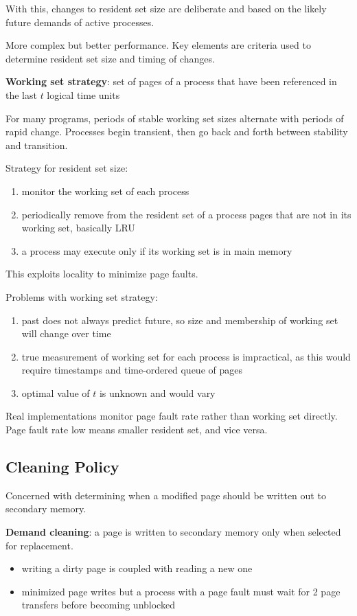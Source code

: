 \documentclass[11pt]{article}
\begin{document}
\begin{enumerate}
With this, changes to resident set size are deliberate and based on the likely
future demands of active processes.

More complex but better performance.
Key elements are criteria used to determine resident set size and timing of
changes.

\textbf{Working set strategy}: set of pages of a process that have been referenced
in the last \(t\) logical time units

For many programs, periods of stable working set sizes alternate with periods of
rapid change.
Processes begin transient, then go back and forth between stability and transition.

Strategy for resident set size:
\begin{enumerate}
\item monitor the working set of each process
\item periodically remove from the resident set of a process pages that are not in
its working set, basically LRU
\item a process may execute only if its working set is in main memory
\end{enumerate}

This exploits locality to minimize page faults.

Problems with working set strategy:
\begin{enumerate}
\item past does not always predict future, so size and membership of working set will
change over time
\item true measurement of working set for each process is impractical, as this would
require timestamps and time-ordered queue of pages
\item optimal value of \(t\) is unknown and would vary
\end{enumerate}

Real implementations monitor page fault rate rather than working set directly.
Page fault rate low means smaller resident set, and vice versa.
\end{enumerate}
\subsection{Cleaning Policy}
\label{sec:org5fc3c68}
Concerned with determining when a modified page should be written out to secondary memory.

\textbf{Demand cleaning}: a page is written to secondary memory only when selected for replacement.
\begin{itemize}
\item writing a dirty page is coupled with reading a new one
\item minimized page writes but a process with a page fault must wait for 2 page transfers
before becoming unblocked
\end{itemize}
\end{document}
